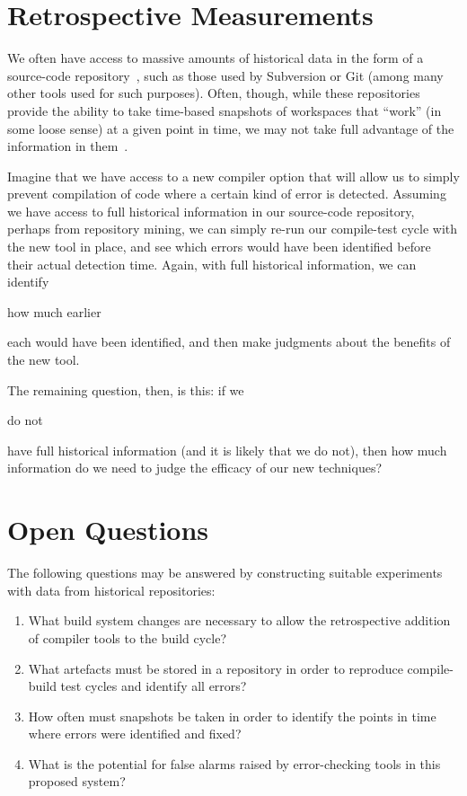 \documentclass{eceasst}
\begin{document}
\section{Retrospective Measurements}

We often have access to massive amounts of historical data in the form
of a source-code
repository~\cite{ball-et-al:1997,zimmermann-et-al:2005}, such as those
used by Subversion or Git (among many other tools used for such
purposes). Often, though, while these repositories provide the ability
to take time-based snapshots of workspaces that ``work'' (in some
loose sense) at a given point in time, we may not take full advantage
of the information in them~\cite{bird-et-al:2009,sisman+kak:2012}.

Imagine that we have access to a new compiler option that will allow
us to simply prevent compilation of code where a certain kind of error
is detected. Assuming we have access to full historical information in
our source-code repository, perhaps from repository mining, we can
simply re-run our compile-test cycle with the new tool in place, and
see which errors would have been identified before their actual
detection time.  Again, with full historical information, we can
identify \begin{em}how much earlier\end{em} each would have been
identified, and then make judgments about the benefits of the new
tool.

The remaining question, then, is this: if we \begin{em}do not\end{em} have
full historical information (and it is likely that we do not), then how
much information do we need to judge the efficacy of our new techniques?

\section{Open Questions}

The following questions may be answered by constructing suitable
experiments with data from historical repositories:

\begin{enumerate}
\item What build system changes are necessary to allow the retrospective
addition of compiler tools to the build cycle?

\item What artefacts must be stored in a repository in order to reproduce
compile-build test cycles and identify all errors?

\item How often must snapshots be taken in order to identify the points
in time where errors were identified and fixed?

\item What is the potential for false alarms raised by error-checking
  tools in this proposed system?

\end{enumerate}





\end{document}
